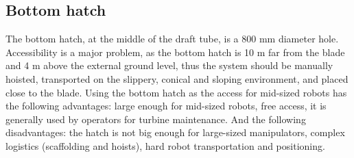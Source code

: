 \subsection{Bottom hatch}\label{bottom}
The bottom hatch, at the middle of the draft tube, is a 800 mm diameter hole.
Accessibility is a major problem, as the bottom hatch is 10 m far from the blade and 4 m above the external ground level, thus
the system should be manually hoisted, transported on the slippery, conical and
sloping environment, and placed close to the blade. Using the bottom hatch
as the access for mid-sized robots has the following advantages: large enough
for mid-sized robots, free access, it is generally used by operators for turbine
maintenance. And the following disadvantages: the hatch is not big enough
for large-sized manipulators, complex logistics (scaffolding and
hoists), hard robot transportation and positioning.






